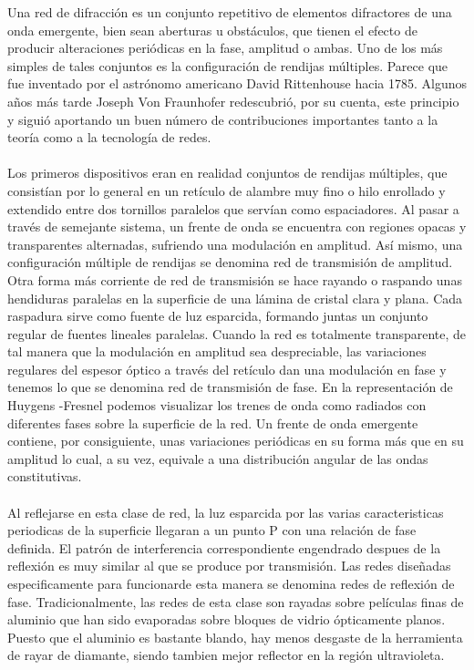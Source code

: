 \documentclass[12]{article}
\begin{document}
\begin{multicols}{2}
Una red de difracción es un conjunto repetitivo de elementos difractores de una onda emergente, bien sean aberturas u obstáculos, que tienen el efecto de producir alteraciones periódicas en la fase, amplitud o ambas. Uno de los más simples de tales conjuntos es la configuración de rendijas múltiples. Parece que fue inventado por el astrónomo americano David Rittenhouse hacia 1785. Algunos años más tarde Joseph Von Fraunhofer redescubrió, por su cuenta, este principio y siguió aportando un buen número de contribuciones importantes tanto a la teoría como a la tecnología de redes.\\ \\ 
Los primeros dispositivos eran en realidad conjuntos de rendijas múltiples, que consistían por lo general en un retículo de alambre muy fino o hilo enrollado y extendido entre dos tornillos paralelos que servían como espaciadores. Al pasar a través de semejante sistema, un frente de onda se encuentra con regiones opacas y transparentes alternadas, sufriendo una modulación en amplitud. Así mismo, una configuración múltiple de rendijas se denomina red de transmisión de amplitud. Otra forma más corriente de red de transmisión se hace rayando o raspando  unas hendiduras paralelas en la superficie de una lámina de cristal clara y plana. Cada raspadura sirve como fuente de luz esparcida, formando juntas un conjunto regular de fuentes lineales paralelas. Cuando la red es totalmente transparente, de tal manera que la modulación en amplitud sea despreciable, las variaciones regulares del espesor óptico a través del retículo dan una modulación en fase y tenemos lo que se denomina red de transmisión de fase. En la representación de Huygens -Fresnel podemos visualizar los trenes de onda como radiados con diferentes fases sobre la superficie de la red. Un frente de onda emergente contiene, por consiguiente, unas variaciones periódicas en su forma más que en su amplitud lo cual, a su vez, equivale a una distribución angular de las ondas constitutivas. \\ \\
Al reflejarse en esta clase de red, la luz esparcida por las varias caracteristicas periodicas de la superficie llegaran a un punto P con una relación de fase definida. El patrón de interferencia correspondiente engendrado despues de la reflexión es muy similar al que se produce por transmisión. Las redes diseñadas especificamente para funcionarde esta manera se denomina redes de reflexión de fase. Tradicionalmente, las redes de esta clase son rayadas sobre películas finas de aluminio que han sido evaporadas sobre bloques de vidrio ópticamente planos. Puesto que el aluminio es bastante blando, hay menos desgaste de la herramienta de rayar de diamante, siendo tambien mejor reflector en la región ultravioleta. \\ \\

\end{multicols}
\end{document}
